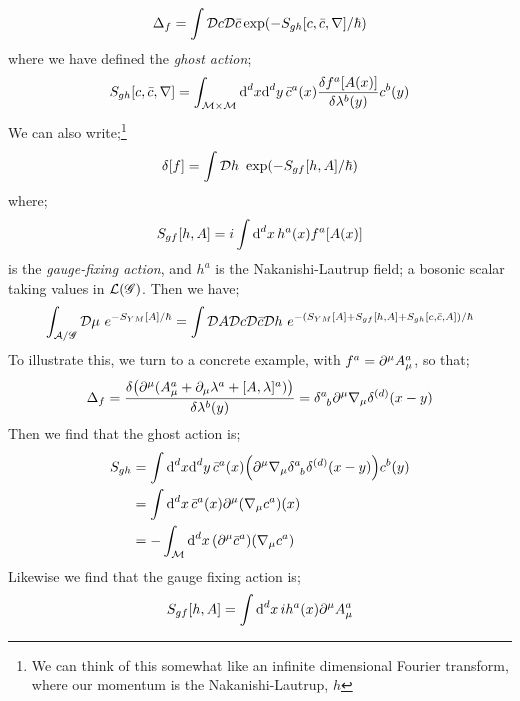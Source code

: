 \begin{equation}
\Delta_f = \int{\mD c \mD \bar{c} \exp\left(-S_{gh}[c, \bar{c}, \nabla]/\hbar\right)}
\end{equation}
where we have defined the \emph{ghost action};
\begin{equation}
S_{gh}[c, \bar{c}, \nabla] = \int_{\mathcal{M} \times \mathcal{M}}{\text{d}^d x \text{d}^d y \,\bar{c}^a (x) \frac{\delta f^a[A(x)]}{\delta \lambda^b(y)}c^b(y)}
\end{equation}
We can also write;\footnote{We can think of this somewhat like an infinite dimensional Fourier transform, where our momentum is the Nakanishi-Lautrup, $h$}
\begin{equation}
\delta[f] = \int{\mD h \,\, \exp\left(-S_{gf}[h, A]/\hbar \right)}
\end{equation}
where;
\begin{equation}
S_{gf}[h, A] = i\int{\text{d}^d x \,h^a(x)f^a[A(x)]}
\end{equation}
is the \emph{gauge-fixing action}, and $h^a$ is the Nakanishi-Lautrup field; a bosonic scalar taking values in $\mathcal{L}(\mathscr{G})$. Then we have;
\begin{equation*}
\int_{\mathcal{A}/\mathscr{G}}{\mathcal{D}\mu\,\,e^{-S_{YM}[A]/\hbar}} = \int{\mathcal{D}A \mathcal{D}c \mathcal{D}\bar{c} \mathcal{D}h \,\, e^{-(S_{YM}[A] + S_{gf}[h, A] + S_{gh}[c, \bar{c}, A])/\hbar}}
\end{equation*} 
To illustrate this, we turn to a concrete example, with $f^a = \partial^\mu A_\mu^a$, so that;
\begin{equation*}
\Delta_f = \frac{\delta\left(\del^\mu(A_\mu^a + \del_\mu \lambda^a + [A, \lambda]^a)\right)}{\delta \lambda^b(y)} = \delta\indices{^{a}_{b}}\del^\mu \nabla_\mu \delta^{(d)}(x - y)
\end{equation*}
Then we find that the ghost action is;
\begin{align*}
S_{gh} &= \int{\ud^d x \upd{^d y}\bar{c}^a(x)\left(\del^\mu \nabla_\mu \delta\indices{^{a}_{b}}\delta^{(d)}(x - y)\right)c^b(y)} \\ 
&= \int{\upd{^d x}\bar{c}^a(x)\del^\mu(\nabla_\mu c^a)(x)} \\
&= -\int_{\mM}{\upd{^d x}(\del^\mu \bar{c}^a)(\nabla_\mu c^a)}
\end{align*}
Likewise we find that the gauge fixing action is;
\begin{equation*}
S_{gf}[h, A] = \int{\text{d}^d x \,i h^a(x)\partial^\mu A_\mu^a}
\end{equation*}
